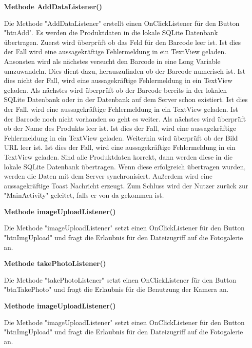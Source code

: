 \documentclass{scrartcl}
\begin{document}
\noindent\textbf{Methode AddDataListener()} 

\noindent Die Methode "AddDataListener" erstellt einen OnClickListener für den Button "btnAdd". Es werden die Produktdaten in die lokale SQLite Datenbank übertragen. Zuerst wird überprüft ob das Feld für den Barcode leer ist. Ist dies der Fall wird eine aussagekräftige Fehlermeldung in ein TextView geladen. Ansonsten wird als nächstes versucht den Barcode in eine Long Variable umzuwandeln. Dies dient dazu, herauszufinden ob der Barcode numerisch ist. Ist dies nicht der Fall, wird eine aussagekräftige Fehlermeldung in ein TextView geladen. Als nächstes wird überprüft ob der Barcode bereits in der lokalen SQLite Datenbank oder in der Datenbank auf dem Server schon existiert. Ist dies der Fall, wird eine aussagekräftige Fehlermeldung in ein TextView geladen. Ist der Barcode noch nicht vorhanden so geht es weiter. Als nächstes wird überprüft ob der Name des Produkts leer ist. Ist dies der Fall, wird eine aussagekräftige Fehlermeldung in ein TextView geladen. Weiterhin wird überprüft ob der Bild URL leer ist. Ist dies der Fall, wird eine aussagekräftige Fehlermeldung in ein TextView geladen. Sind alle Produktdaten korrekt, dann werden diese in die lokale SQLite Datenbank übertragen. Wenn diese erfolgreich übertragen wurden, werden die Daten mit dem Server synchronisiert. Außerdem wird eine aussagekräftige Toast Nachricht erzeugt. Zum Schluss wird der Nutzer zurück zur "MainActivity" geleitet, falls er von da gekommen ist.\newline 

\noindent\textbf{Methode imageUploadListener()} 

\noindent Die Methode "imageUploadListener" setzt einen OnClickListener für den Button "btnImgUpload" und fragt die Erlaubnis für den Dateizugriff auf die Fotogalerie an.\newline 

\noindent\textbf{Methode takePhotoListener()} 

\noindent Die Methode "takePhotoListener" setzt einen OnClickListener für den Button "btnTakePhoto" und fragt die Erlaubnis für die Benutzung der Kamera an. \newline

\noindent\textbf{Methode imageUploadListener()} 

\noindent Die Methode "imageUploadListener" setzt einen OnClickListener für den Button "btnImgUpload" und fragt die Erlaubnis für den Dateizugriff auf die Fotogalerie an. \newline
\end{document}
